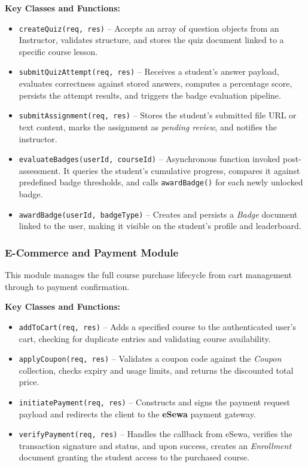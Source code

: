 \textbf{Key Classes and Functions:}
\begin{itemize}
    \item \texttt{createQuiz(req, res)} -- Accepts an array of question objects from an Instructor, validates structure, and stores the quiz document linked to a specific course lesson.
    \item \texttt{submitQuizAttempt(req, res)} -- Receives a student's answer payload, evaluates correctness against stored answers, computes a percentage score, persists the attempt results, and triggers the badge evaluation pipeline.
    \item \texttt{submitAssignment(req, res)} -- Stores the student's submitted file URL or text content, marks the assignment as \textit{pending review}, and notifies the instructor.
    \item \texttt{evaluateBadges(userId, courseId)} -- Asynchronous function invoked post-assessment. It queries the student's cumulative progress, compares it against predefined badge thresholds, and calls \texttt{awardBadge()} for each newly unlocked badge.
    \item \texttt{awardBadge(userId, badgeType)} -- Creates and persists a \textit{Badge} document linked to the user, making it visible on the student's profile and leaderboard.
\end{itemize}

\subsubsection{E-Commerce and Payment Module}

This module manages the full course purchase lifecycle from cart management through to payment confirmation.

\textbf{Key Classes and Functions:}
\begin{itemize}
    \item \texttt{addToCart(req, res)} -- Adds a specified course to the authenticated user's cart, checking for duplicate entries and validating course availability.
    \item \texttt{applyCoupon(req, res)} -- Validates a coupon code against the \textit{Coupon} collection, checks expiry and usage limits, and returns the discounted total price.
    \item \texttt{initiatePayment(req, res)} -- Constructs and signs the payment request payload and redirects the client to the \textbf{eSewa} payment gateway.
    \item \texttt{verifyPayment(req, res)} -- Handles the callback from eSewa, verifies the transaction signature and status, and upon success, creates an \textit{Enrollment} document granting the student access to the purchased course.
\end{itemize}

